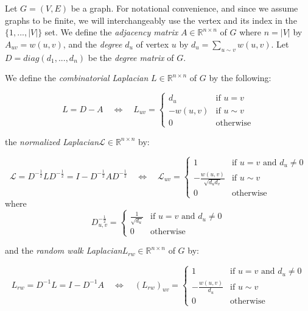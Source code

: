 Let $G = (V,E)$ be a graph. For notational convenience, and since we assume graphs to be finite, we will interchangeably use the vertex and its index in the $\{1, ..., |V|\}$ set. We define the \emph{adjacency matrix} $A \in \mathbb{R}^{n \times n}$ of $G$ where $n = |V|$ by $A_{uv} = w(u,v)$, and the \emph{degree} $d_u$ of vertex $u$ by $d_u = \sum_{u \sim v} w(u,v)$. Let $D = diag(d_1, ..., d_n)$ be the \emph{degree matrix} of $G$.

\label{sec:laplacians}
We define the \emph{combinatorial Laplacian} $L \in \mathbb{R}^{n \times n}$ of $G$ by the following:

\[
L = D - A \quad \Leftrightarrow \quad L_{uv} = \begin{cases}
d_u & \text{if }u = v \\
-w(u,v) & \text{if }u \sim v \\
0 & \text{otherwise}
\end{cases}
\]

the \emph{normalized Laplacian}\footnotemark[1] $\mathcal{L} \in \mathbb{R}^{n \times n}$ by:


\[
\mathcal{L} = D^{-\frac{1}{2}}LD^{-\frac{1}{2}} = I - D^{-\frac{1}{2}}AD^{-\frac{1}{2}} \quad \Leftrightarrow \quad \mathcal{L}_{uv} = \begin{cases}
1 & \text{if } u = v \text{ and } d_u \neq 0\\
-\frac{w(u,v)}{\sqrt{d_ud_v}} & \text{if } u \sim v\\
0 & \text{otherwise}
\end{cases}
\]
where
\[
D^{-\frac{1}{2}}_{u,v} = \begin{cases}
\frac{1}{\sqrt{d_u}} & \text{if }u = v\text{ and }d_u \neq 0\\
0 & \text{otherwise}
\end{cases}
\]

and the \emph{random walk Laplacian}\footnotemark[2] $L_{rw} \in \mathbb{R}^{n \times n}$ of $G$ by:


\[
L_{rw} = D^{-1}L = I - D^{-1}A \quad \Leftrightarrow \quad (L_{rw})_{uv} = \begin{cases}
1 & \text{if }u = v \text{ and }d_u \neq 0 \\
-\frac{w(u,v)}{d_u} & \text{if }u \sim v \\
0 & \text{otherwise}
\end{cases}
\]

